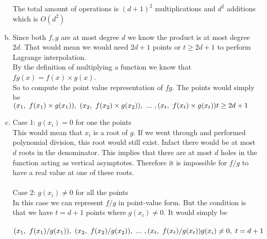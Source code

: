 \documentclass[11pt,letterpaper]{article}
\begin{document}
\begin{enumerate}[(a)]
The total amount of operations is $(d+1)^2$ multiplications and $d^2$ additions which is $O(d^2)$
\item
Since both $f,g$ are at most degree $d$ we know the product is at most degree $2d$. That would mean we would need $2d+1$ points or $t\geq 2d+1$ to perform Lagrange interpolation.\\
By the definition of multiplying a function we know that $fg(x) = f(x)\times g(x)$.\\
So to compute the point value representation of $fg$. The points would simply be\\
$(x_1,~f(x_1)\times g(x_1)),~(x_2,~f(x_2)\times g(x_2)),~...~,(x_t,~f(x_t)\times g(x_t))\hfill t\geq 2d+1$
\item
Case 1: $g(x_i) = 0$ for one the points\\
This would mean that $x_i$ is a root of $g$. If we went through and performed polynomial division, this root would still exist. Infact there would be at most $d$ roots in the denominator. This implies that there are at most $d$ holes in the function acting as vertical asymptotes. Therefore it is impossible for $f/g$ to have a real value at one of these roots.\\\\
Case 2: $g(x_i) \neq 0$ for all the points\\
In this case we can represent $f/g$ in point-value form. But the condition is that we have $t = d+1$ points where $g(x_i) \neq 0$. It would simply be\\\\
$(x_1,~f(x_1)/g(x_1)),~(x_2,~f(x_2)/g(x_2)),~...~,(x_t,~f(x_t)/g(x_t))\hfill g(x_i)\neq 0,~t= d+1$


\end{enumerate}
\clearpage
\end{document}
